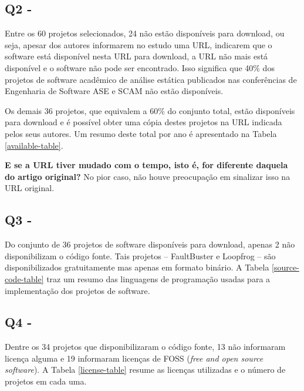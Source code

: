 \subsection{Q2 - \EstudoUmQuestaoDois} %

Entre os 60 projetos selecionados, 24 não estão disponíveis para download, ou
seja, apesar dos autores informarem no estudo uma URL, indicarem que o software
está disponível nesta URL para download, a URL não mais está disponível e o
software não pode ser encontrado. Isso significa que 40\% dos projetos de software
acadêmico de análise estática publicados nas conferências de Engenharia de
Software ASE e SCAM não estão disponíveis.

Os demais 36 projetos, que equivalem a 60\% do conjunto total, estão
disponíveis para download e é possível obter uma cópia destes projetos na URL
indicada pelos seus autores. Um resumo deste total por ano é apresentado na
Tabela \ref{available-table}.


\textbf{E se a URL tiver mudado com o tempo, isto é, for diferente daquela do artigo original?}
No pior caso, não houve preocupação em sinalizar isso na URL original.




\subsection{Q3 - \EstudoUmQuestaoTres} %

Do conjunto de 36 projetos de software disponíveis para download, apenas 2 não
disponibilizam o código fonte. Tais projetos -- FaultBuster e Loopfrog --
são disponibilizados gratuitamente mas apenas em
formato binário. A Tabela \ref{source-code-table} traz um resumo das
linguagens de programação usadas para a implementação dos projetos de software.



\subsection{Q4 - \EstudoUmQuestaoQuatro} %

Dentre os 34 projetos que disponibilizaram o código fonte, 13 não informaram
licença alguma e 19 informaram licenças de FOSS ({\it free and open source
software}). A Tabela \ref{license-table} resume as licenças utilizadas e o
número de projetos em cada uma.




